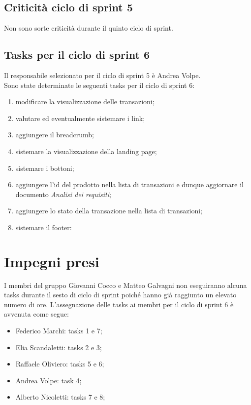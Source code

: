 \documentclass[a4paper, 12pt]{article}
\begin{document}
\subsection{Criticità ciclo di sprint 5}
Non sono sorte criticità durante il quinto ciclo di sprint.


\subsection{Tasks per il ciclo di sprint 6}
Il responsabile selezionato per il ciclo di sprint 5 è Andrea Volpe. \\
Sono state determinate le seguenti tasks per il ciclo di sprint 6:
\begin{enumerate}
	\item modificare la visualizzazione delle transazioni;
  \item valutare ed eventualmente sistemare i link;
  \item aggiungere il breadcrumb;
  \item sistemare la visualizzazione della landing page;
  \item sistemare i bottoni;
  \item aggiungere l'id del prodotto nella lista di transazioni e dunque aggiornare il documento \textit{Analisi dei requisiti};
  \item aggiungere lo stato della transazione nella lista di transazioni;
  \item sistemare il footer:
\end{enumerate}

\section{Impegni presi}
I membri del gruppo Giovanni Cocco e Matteo Galvagni non eseguiranno alcuna tasks durante il sesto di ciclo di sprint poiché hanno già raggiunto un elevato numero di ore.
L'assegnazione delle tasks ai membri per il ciclo di sprint 6 è avvenuta come segue:
\begin{itemize}
  \item Federico Marchi: tasks 1 e 7;
  \item Elia Scandaletti: tasks 2 e 3;
  \item Raffaele Oliviero: tasks 5 e 6;
  \item Andrea Volpe: task 4;
  \item Alberto Nicoletti: tasks 7 e 8;
\end{itemize}
\end{document}
